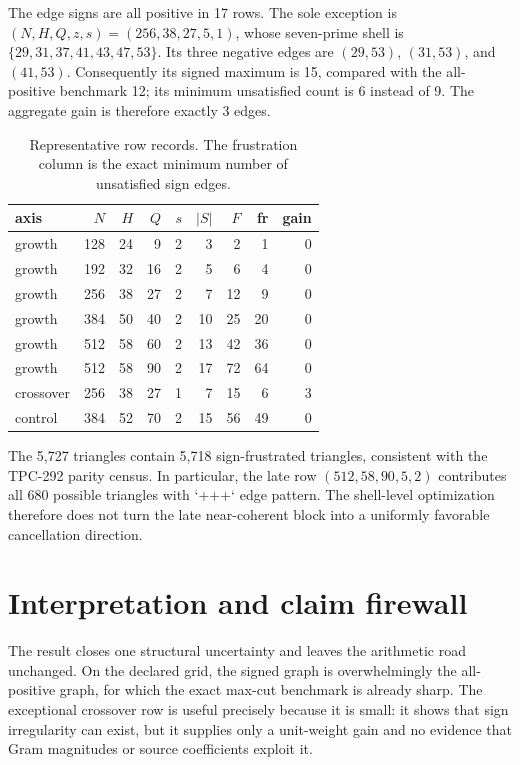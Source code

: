 \documentclass[10pt]{article}
\begin{document}
The edge signs are all positive in 17 rows.  The sole exception is
$(N,H,Q,z,s)=(256,38,27,5,1)$, whose seven-prime shell is
$\{29,31,37,41,43,47,53\}$.  Its three negative edges are
$(29,53)$, $(31,53)$, and $(41,53)$.  Consequently its signed maximum is
15, compared with the all-positive benchmark 12; its minimum unsatisfied
count is 6 instead of 9.  The aggregate gain is therefore exactly 3 edges.

\begin{table}[ht]
\centering
\scriptsize
\caption{Representative row records.  The frustration column is the exact
minimum number of unsatisfied sign edges.}
\label{tab:rows}
\begin{tabular}{@{}lrrrrrrrr@{}}
\toprule
axis & $N$ & $H$ & $Q$ & $s$ & $|S|$ & $F$ & fr & gain\\
\midrule
growth &128&24&9 &2&3 &2 &1 &0\\
growth &192&32&16&2&5 &6 &4 &0\\
growth &256&38&27&2&7 &12&9 &0\\
growth &384&50&40&2&10&25&20&0\\
growth &512&58&60&2&13&42&36&0\\
growth &512&58&90&2&17&72&64&0\\
crossover&256&38&27&1&7 &15&6 &3\\
control &384&52&70&2&15&56&49&0\\
\bottomrule
\end{tabular}
\end{table}

The 5,727 triangles contain 5,718 sign-frustrated triangles, consistent with
the TPC-292 parity census.  In particular, the late row
$(512,58,90,5,2)$ contributes all 680 possible triangles with `+++` edge
pattern.  The shell-level optimization therefore does not turn the late
near-coherent block into a uniformly favorable cancellation direction.

\section{Interpretation and claim firewall}

The result closes one structural uncertainty and leaves the arithmetic road
unchanged.  On the declared grid, the signed graph is overwhelmingly the
all-positive graph, for which the exact max-cut benchmark is already sharp.
The exceptional crossover row is useful precisely because it is small: it
shows that sign irregularity can exist, but it supplies only a unit-weight
gain and no evidence that Gram magnitudes or source coefficients exploit it.
\end{document}
